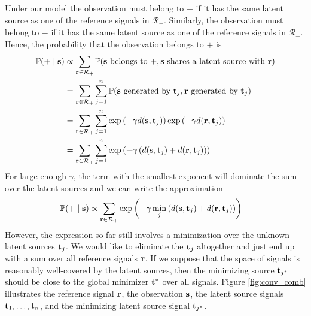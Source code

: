 Under our model the observation must belong to $+$ if it has the same
latent source as one of the reference signals in $\mathcal{R}_+$. Similarly, the
observation must belong to $-$ if it has the same latent source as one of the
reference signals in $\mathcal{R}_-$. Hence, the probability that the
observation belongs to $+$ is
\begin{align}
\mathbb{P}(+ \;|\; \mathbf s) &\propto \sum_{\mathbf r \in \mathcal{R}_+} \mathbb{P}(\mathbf s \text{ belongs to } +, \mathbf s \text{ shares a latent source
  with } \mathbf r)\notag\\
&= \sum_{\mathbf r \in \mathcal{R}_+} \sum_{j = 1}^n \mathbb{P}( \mathbf s \text{ generated by }
\mathbf t_j, \mathbf r \text{ generated by } \mathbf t_j)\notag\\
&= \sum_{\mathbf r \in \mathcal{R}_+} \sum_{j = 1}^n \exp{\left(-\gamma
    d(\mathbf s,\mathbf t_j)\right)} \exp{\left(-\gamma d(\mathbf r,\mathbf t_j)\right)}\notag\\
&= \sum_{\mathbf r \in \mathcal{R}_+} \sum_{j = 1}^n \exp{\left(-\gamma\left(
    d(\mathbf s,\mathbf t_j) + d(\mathbf r,\mathbf t_j) \right)\right)}
\end{align}
For large enough $\gamma$, the term with the smallest exponent will dominate the sum
over the latent sources and we can write the approximation
\begin{align}
\mathbb{P}(+ \;|\; \mathbf s) &\propto \sum_{\mathbf r \in \mathcal{R}_+}
\exp{\left(-\gamma \min_{j} \left( d(\mathbf s,\mathbf t_j) + d(\mathbf r,\mathbf t_j) \right) \right)} \label{eqn:prob_plus}
\end{align}
However, the expression so far still involves a minimization over the unknown
latent sources $\mathbf t_j$. We would like to eliminate the $\mathbf t_j$ altogether
and just end up with a sum over all reference signals $\mathbf r$. If we suppose
that the space of signals is reasonably well-covered by the latent sources, then
the minimizing source $\mathbf t_{j^*}$ should be close to the global minimizer
$\mathbf t^*$ over all signals. Figure \ref{fig:conv_comb} illustrates the reference
signal $\mathbf r$, the observation $\mathbf s$, the latent source signals $\mathbf t_1, \dots,
\mathbf t_n$, and the minimizing latent source signal $\mathbf t_{j^*}$.
